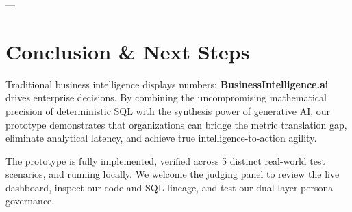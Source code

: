 \documentclass[11pt,a4paper]{article}
\begin{document}
---

\section{Conclusion \& Next Steps}
Traditional business intelligence displays numbers; \textbf{BusinessIntelligence.ai} drives enterprise decisions. By combining the uncompromising mathematical precision of deterministic SQL with the synthesis power of generative AI, our prototype demonstrates that organizations can bridge the metric translation gap, eliminate analytical latency, and achieve true intelligence-to-action agility.

\vspace{1em}
\begin{tcolorbox}[colback=accenturepurple!5,colframe=accenturepurple,title=\textbf{Ready for Live Demonstration}]
The prototype is fully implemented, verified across 5 distinct real-world test scenarios, and running locally. We welcome the judging panel to review the live dashboard, inspect our code and SQL lineage, and test our dual-layer persona governance.
\end{tcolorbox}
\end{document}

